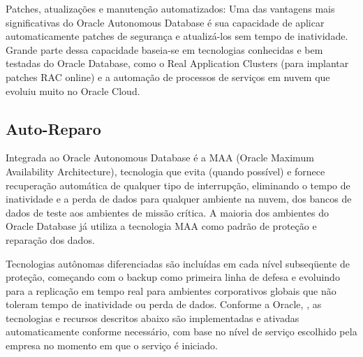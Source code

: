 \begin{alineas}
\item Patches, atualizações e manutenção automatizados: Uma das vantagens mais significativas do Oracle Autonomous Database é sua capacidade de aplicar automaticamente patches de segurança e atualizá-los sem tempo de inatividade. Grande parte dessa capacidade baseia-se em tecnologias conhecidas e bem testadas do Oracle Database, como o Real Application Clusters (para implantar patches RAC online) e a automação de processos de serviços em nuvem que evoluiu muito no Oracle Cloud.
\end{alineas}


\subsection{Auto-Reparo}

Integrada ao Oracle Autonomous Database é a MAA (Oracle Maximum Availability Architecture), tecnologia que evita (quando possível) e fornece recuperação automática de qualquer tipo de interrupção, eliminando o tempo de inatividade e a perda de dados para qualquer ambiente na nuvem, dos bancos de dados de teste aos ambientes de missão crítica. A maioria dos ambientes do Oracle Database já utiliza a tecnologia MAA como padrão de proteção e reparação dos dados.

Tecnologias autônomas diferenciadas são incluídas em cada nível subseqüente de proteção, começando com o backup como primeira linha de defesa e evoluindo para a replicação em tempo real para ambientes corporativos globais que não toleram tempo de inatividade ou perda de dados. Conforme a Oracle, \cite{WPReparo}, as tecnologias e recursos descritos abaixo são implementadas e ativadas automaticamente conforme necessário, com base no nível de serviço escolhido pela empresa no momento em que o serviço é iniciado.

